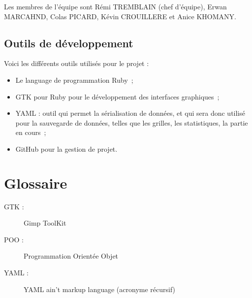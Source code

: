 \documentclass[11pt]{article}
\begin{document}
Les membres de l'équipe sont Rémi TREMBLAIN (chef d'équipe), Erwan MARCAHND, Colas PICARD, Kévin CROUILLERE et Anice KHOMANY.





\subsection{Outils de développement}

Voici les différents outils utilisés pour le projet :

\begin{itemize}
   \item Le language de programmation Ruby~;
   \item GTK pour Ruby pour le développement des interfaces graphiques~;
   \item YAML : outil qui permet la sérialisation de données, et qui sera donc utilisé pour la sauvegarde de données, telles que les grilles, les statistiques, la partie en cours~;
   \item GitHub pour la gestion de projet.
\end{itemize}



\section{Glossaire}

\begin{description}
\item [GTK : ]Gimp ToolKit
\item [POO : ]Programmation Orientée Objet
\item [YAML : ]YAML ain't markup language (acronyme récursif)
\end{description}

\renewcommand{\thefootnote}{\*} %
\end{document}
